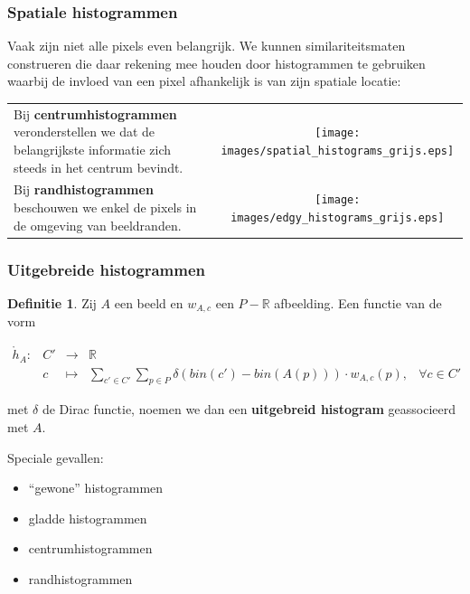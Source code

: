 \documentclass[dutch]{beamer}
\theoremstyle{definition}
\newtheorem{definitie}[theorem]{Definitie}
\theoremstyle{remark}
\theoremstyle{example}
\begin{document}
{
  \frametitle{Spatiale histogrammen}
  
  Vaak zijn niet alle pixels even belangrijk. We kunnen similariteitsmaten construeren
  die daar rekening mee houden door histogrammen te gebruiken waarbij de
  invloed van een pixel afhankelijk is van zijn spatiale locatie:
  \begin{center}
  \begin{tabular}{@{}lc@{}}
  \begin{minipage}{0.55\textwidth}
  \raggedright
  Bij \textbf{centrumhistogrammen} veronderstellen we dat de belangrijkste informatie
  zich steeds in het centrum bevindt.
  \end{minipage} &
  \begin{minipage}{0.4\textwidth}
  \texttt{[image: images/spatial\_histograms\_grijs.eps]}
  \end{minipage}\vspace{8pt}\\
  \begin{minipage}{0.55\textwidth}
  Bij \textbf{randhistogrammen} beschouwen we enkel de pixels in de omgeving
  van beeldranden.
  \end{minipage} &
  \begin{minipage}{0.4\textwidth}
  \texttt{[image: images/edgy\_histograms\_grijs.eps]}
  \end{minipage}
  \end{tabular}
  \end{center}
}
\frame
{ 
  \frametitle{Uitgebreide histogrammen}
  
  \begin{definitie}
  Zij $A$ een beeld en $w_{A,c}$ een $P - \mathbb{R}$ afbeelding. Een functie van de vorm
  \begin{minipage}{\textwidth}
  \vspace{5pt}
  \centering
  \footnotesize
  $\begin{array}{rrcll}
  \mathring{h}_A: 
   & C' & \to & \mathbb{R} \\
   & c  & \mapsto & \displaystyle\sum_{c' \in C'} \sum_{p \in P} \delta (bin(c')-bin(A(p))) \cdot w_{A,c}(p), & 
   \forall c \in C'
  \end{array}$
  \vspace{5pt}
  \end{minipage}
  met $\delta$ de Dirac functie, noemen we dan een \textbf{uitgebreid histogram} 
  geassocieerd met $A$.
  \end{definitie}

  Speciale gevallen:
  \begin{itemize}
    \item ``gewone'' histogrammen
    \item gladde histogrammen
    \item centrumhistogrammen
    \item randhistogrammen
  \end{itemize}
}
\end{document}
